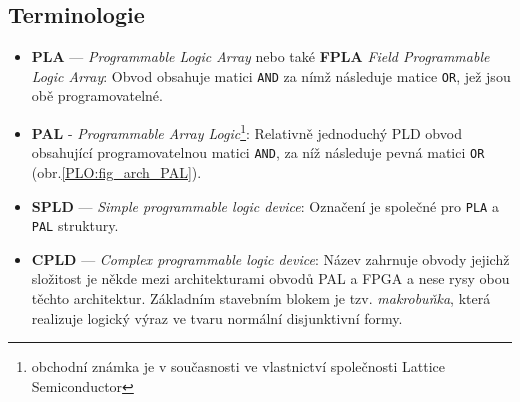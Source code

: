     \subsection{Terminologie}
      \begin{itemize}
        \item \textbf{PLA} — \emph{Programmable Logic Array} nebo také \textbf{FPLA} \emph{Field
              Programmable Logic Array}: Obvod obsahuje matici \texttt{AND} za nímž následuje matice
              \texttt{OR}, jež jsou obě programovatelné.
        \item \textbf{PAL} - \emph{Programmable Array Logic}\footnote{obchodní známka je v
              současnosti ve vlastnictví společnosti Lattice Semiconductor}: Relativně jednoduchý
              PLD obvod obsahující programovatelnou matici \texttt{AND}, za níž následuje pevná
              matici \texttt{OR} (obr.\ref{PLO:fig_arch_PAL}). %
        \item \textbf{SPLD} — \emph{Simple programmable logic device}: Označení je společné pro \texttt{PLA} a \texttt{PAL}
        struktury.
        \item \textbf{CPLD} — \emph{Complex programmable logic device}: Název zahrnuje obvody jejichž složitost je někde mezi 
          architekturami obvodů PAL a FPGA a nese rysy obou těchto architektur. Základním stavebním blokem je tzv.
          \emph{makrobuňka}, která realizuje logický výraz ve tvaru normální disjunktivní formy.   

\end{itemize}
